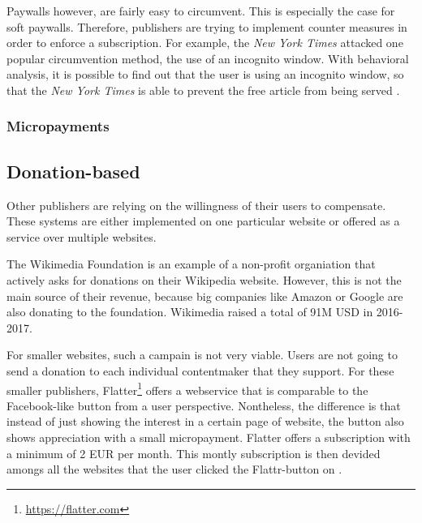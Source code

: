 
Paywalls however, are fairly easy to circumvent. This is especially the case for soft paywalls. Therefore, publishers are trying to implement counter measures in order to enforce a subscription. For example, the \textit{New York Times} attacked one popular circumvention method, the use of an incognito window. With behavioral analysis, it is possible to find out that the user is using an incognito window, so that the \textit{New York Times} is able to prevent the free article from being served \cite{troupson2015yes}.  

\subsubsection{Micropayments}



\subsection{Donation-based}

Other publishers are relying on the willingness of their users to compensate. These systems are either implemented on one particular website or offered as a service over multiple websites. 

The Wikimedia Foundation is an example of a non-profit organiation that actively asks for donations on their Wikipedia website. However, this is not the main source of their revenue, because big companies like Amazon or Google are also donating to the foundation. Wikimedia raised a total of 91M USD in 2016-2017. \cite{wikimediadonation}

For smaller websites, such a campain is not very viable. Users are not going to send a donation to each individual contentmaker that they support. For these smaller publishers, Flatter\footnote{\url{https://flatter.com}} offers a webservice that is comparable to the Facebook-like button from a user perspective. Nontheless, the difference is that instead of just showing the interest in a certain page of website, the button also shows appreciation with a small micropayment. Flatter offers a subscription with a minimum of 2 EUR per month. This montly subscription is then devided amongs all the websites that the user clicked the Flattr-button on \cite{loll2010flattr}.







